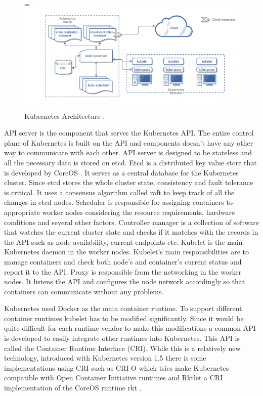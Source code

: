 \documentclass[12pt,oneandhalf,chaparabic,ceng,ms,eng,oneside,pntc]{gsufbe}
\makeatletter
\let\old@includegraphics\includegraphics
\renewcommand{\includegraphics}[2][,]{%
  \setbox9=\hbox{\old@includegraphics[#1]{#2}}%
  \ifdim\wd9>\textwidth
    \old@includegraphics[#1,width=\textwidth]{#2}%
  \else
    \old@includegraphics[#1]{#2}%
  \fi%
}
\makeatother
\begin{document}
\begin{figure}
\centering
\includegraphics[]{k8s-arch.png}
\caption{Kubernetes Architecture \cite{kube_arch}.}
\label{fig:k8sarch}
\end{figure}

API server is the component that serves the Kubernetes API.  The entire control plane of Kubernetes is
built on the API and components doesn't have any other way to communicate with each other.  API server
is designed to be stateless and all the necessary data is stored on etcd.
Etcd is a distributed key value store that is developed by CoreOS \cite{coreos}.  It serves as a central database for
the Kubernetes cluster.  Since etcd stores the whole cluster state, consistency and fault tolerance is
critical.  It uses a consensus algorithm called raft \cite{raft} to keep track of all the changes in etcd nodes.
Scheduler is responsible for assigning containers to appropriate worker nodes considering the resource
requirements, hardware conditions and several other factors.
Controller manager is a collection of software that watches the current cluster state and checks if it
matches with the records in the API such as node availability, current endpoints etc.
Kubelet is the main Kubernetes daemon in the worker nodes.  Kubelet's main responsibilities are to 
manage containers and check both node's and container's current status and report it to the API.
Proxy is responsible from the networking in the worker nodes.  It listens the API and configures the
node network accordingly so that containers can communicate without any problems.

Kubernetes used Docker as the main container runtime.  To support different container runtimes kubelet
has to be modified significantly.  Since it would be quite difficult for each runtime vendor to make
this modifications a common API is developed to easily integrate other runtimes into Kubernetes.  This
API is called the Container Runtime Interface (CRI).  While this is a relatively new technology,
introduced with Kubernetes version 1.5 there is some implementations using CRI such as CRI-O \cite{crio} which
tries make Kubernetes compatible with Open Container Initiative runtimes and Rktlet a CRI
implementation of the CoreOS runtime rkt \cite{rkt}.
\end{document}
